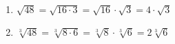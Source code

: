\medskip

\begin{enumerate}
\setlength\itemsep{1em}
\item $\sqrt{48}=\sqrt{16\cdot 3}=\sqrt{16}\cdot\sqrt{3}=4\cdot\sqrt{3}$
\item $\sqrt[3]{48}=\sqrt[3]{8\cdot 6}=\sqrt[3]{8}\cdot\sqrt[3]{6}=2\sqrt[3]{6}$
\end{enumerate}